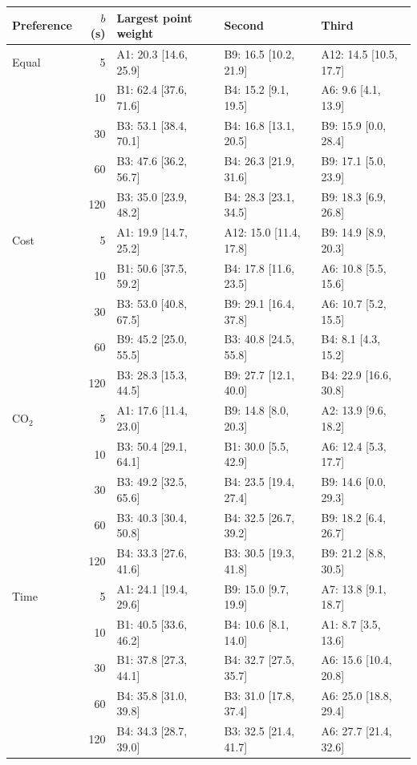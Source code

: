 \begin{table}[p]\centering\footnotesize
\setlength{\tabcolsep}{3pt}
\begin{tabular}{lrlll}\toprule
Preference & $b$ (s) & Largest point weight & Second & Third\\\midrule
Equal & 5 & A1: 20.3 [14.6, 25.9] & B9: 16.5 [10.2, 21.9] & A12: 14.5 [10.5, 17.7]\\
 & 10 & B1: 62.4 [37.6, 71.6] & B4: 15.2 [9.1, 19.5] & A6: 9.6 [4.1, 13.9]\\
 & 30 & B3: 53.1 [38.4, 70.1] & B4: 16.8 [13.1, 20.5] & B9: 15.9 [0.0, 28.4]\\
 & 60 & B3: 47.6 [36.2, 56.7] & B4: 26.3 [21.9, 31.6] & B9: 17.1 [5.0, 23.9]\\
 & 120 & B3: 35.0 [23.9, 48.2] & B4: 28.3 [23.1, 34.5] & B9: 18.3 [6.9, 26.8]\\
\midrule
Cost & 5 & A1: 19.9 [14.7, 25.2] & A12: 15.0 [11.4, 17.8] & B9: 14.9 [8.9, 20.3]\\
 & 10 & B1: 50.6 [37.5, 59.2] & B4: 17.8 [11.6, 23.5] & A6: 10.8 [5.5, 15.6]\\
 & 30 & B3: 53.0 [40.8, 67.5] & B9: 29.1 [16.4, 37.8] & A6: 10.7 [5.2, 15.5]\\
 & 60 & B9: 45.2 [25.0, 55.5] & B3: 40.8 [24.5, 55.8] & B4: 8.1 [4.3, 15.2]\\
 & 120 & B3: 28.3 [15.3, 44.5] & B9: 27.7 [12.1, 40.0] & B4: 22.9 [16.6, 30.8]\\
\midrule
CO$_2$ & 5 & A1: 17.6 [11.4, 23.0] & B9: 14.8 [8.0, 20.3] & A2: 13.9 [9.6, 18.2]\\
 & 10 & B3: 50.4 [29.1, 64.1] & B1: 30.0 [5.5, 42.9] & A6: 12.4 [5.3, 17.7]\\
 & 30 & B3: 49.2 [32.5, 65.6] & B4: 23.5 [19.4, 27.4] & B9: 14.6 [0.0, 29.3]\\
 & 60 & B3: 40.3 [30.4, 50.8] & B4: 32.5 [26.7, 39.2] & B9: 18.2 [6.4, 26.7]\\
 & 120 & B4: 33.3 [27.6, 41.6] & B3: 30.5 [19.3, 41.8] & B9: 21.2 [8.8, 30.5]\\
\midrule
Time & 5 & A1: 24.1 [19.4, 29.6] & B9: 15.0 [9.7, 19.9] & A7: 13.8 [9.1, 18.7]\\
 & 10 & B1: 40.5 [33.6, 46.2] & B4: 10.6 [8.1, 14.0] & A1: 8.7 [3.5, 13.6]\\
 & 30 & B1: 37.8 [27.3, 44.1] & B4: 32.7 [27.5, 35.7] & A6: 15.6 [10.4, 20.8]\\
 & 60 & B4: 35.8 [31.0, 39.8] & B3: 31.0 [17.8, 37.4] & A6: 25.0 [18.8, 29.4]\\
 & 120 & B4: 34.3 [28.7, 39.0] & B3: 32.5 [21.4, 41.7] & A6: 27.7 [21.4, 32.6]\\

\end{tabular}
\end{table}
